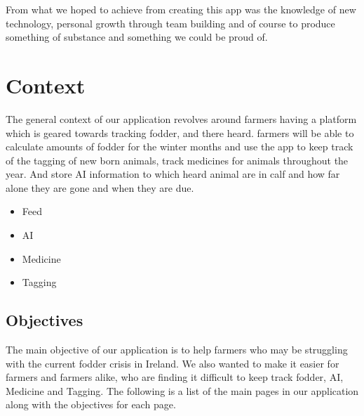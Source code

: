 \documentclass[12pt,a4paper,oneside,openany]{book}
\begin{document}
From what we hoped to achieve from creating this app was the knowledge of new technology, personal growth through team building and of course to produce something of substance and something we could be proud of.

\chapter{Context}

The general context of our application revolves around farmers having a platform which is geared towards tracking fodder, and there heard. farmers will be able to calculate amounts of fodder for the winter months and use the app to keep track of the tagging of new born animals, track medicines for animals throughout the year. And store AI information to which heard animal are in calf and how far alone they are gone and when they are due.


\begin{itemize}
	  \item Feed
	  \item AI
	  \item Medicine 
	  \item Tagging
	\end{itemize}


\section{Objectives} \label{objectives}
The main objective of our application is to help farmers who may be struggling with the current fodder crisis in Ireland. We also wanted to make it easier for farmers and farmers alike, who are finding it difficult to keep track fodder, AI, Medicine and Tagging. The following is a list of the main pages in our application along with the objectives for each page. 
\end{document}
